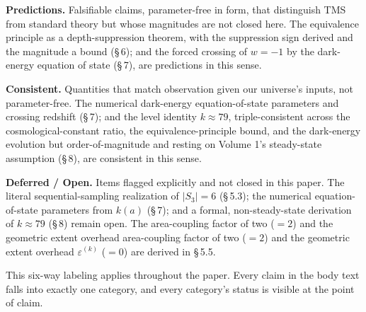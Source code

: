 \documentclass[11pt,oneside]{report}
\theoremstyle{definition}
\theoremstyle{remark}
\begin{document}
\textbf{Predictions.} Falsifiable claims, parameter-free in form, that
distinguish TMS from standard theory but whose magnitudes are not closed
here. The equivalence principle as a depth-suppression theorem, with the
suppression sign derived and the magnitude a bound (\S\,6); and the forced
crossing of \ensuremath{w = -1} by the dark-energy equation of state
(\S\,7), are predictions in this sense.

\textbf{Consistent.} Quantities that match observation given our
universe's inputs, not parameter-free. The numerical dark-energy
equation-of-state parameters and crossing redshift (\S\,7); and the level
identity \ensuremath{k \approx 79}, triple-consistent across the
cosmological-constant ratio, the equivalence-principle bound, and the
dark-energy evolution but order-of-magnitude and resting on Volume 1's
steady-state assumption (\S\,8), are consistent in this sense.

\textbf{Deferred / Open.} Items flagged explicitly and not closed in this
paper. The literal
sequential-sampling realization of \ensuremath{|S_3| = 6} (\S\,5.3); the numerical
equation-of-state parameters from \ensuremath{k(a)} (\S\,7); and a formal,
non-steady-state derivation of \ensuremath{k \approx 79} (\S\,8) remain open. The
area-coupling factor of two (\ensuremath{= 2}) and the geometric extent overhead
area-coupling factor of two (\ensuremath{= 2}) and the geometric extent overhead
\ensuremath{\varepsilon^{(k)}} (\ensuremath{= 0}) are derived in \S\,5.5.

This six-way labeling applies throughout the paper. Every claim in the
body text falls into exactly one category, and every category's status is
visible at the point of claim.
\end{document}

